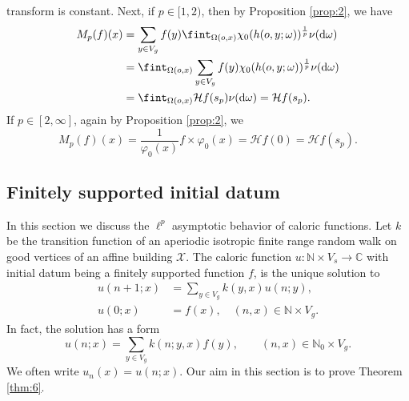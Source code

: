 \documentclass[11pt]{amsart}
\newcommand{\CC}{\mathbb{C}}
\newcommand{\NN}{\mathbb{N}}
\newcommand{\calH}{\mathcal{H}}
\newcommand{\scrX}{\mathscr{X}}
\newcommand{\vphi}{\varphi}
\theoremstyle{plain}
\newcounter{thm}
\theoremstyle{definition}
\numberwithin{equation}{section}
\begin{document}
transform is constant. Next, if $p \in [1, 2)$, then by Proposition \ref{prop:2}, we have
\begin{align*}
	M_p(f)(x) 
	&= \sum_{y \in V_g} f(y) \fint_{\Omega(o, x)} \chi_0(h(o, y; \omega))^{\frac1p} \nu({\rm d} \omega) \\
	&= \fint_{\Omega(o, x)} \sum_{y \in V_g} f(y) \chi_0(h(o, y; \omega))^{\frac1p} \nu({\rm d} \omega) \\
	&= \fint_{\Omega(o, x)} \calH f(s_p) \nu({\rm d} \omega) = \calH f(s_p).
\end{align*}
If $p \in [2, \infty]$, again by Proposition \ref{prop:2}, we
\[
	M_p(f)(x) 
	= \frac{1}{\vphi_0(x)} f \times \vphi_0(x)
	= \calH f(0) = \calH f(s_p).
\]

\subsection{Finitely supported initial datum}
In this section we discuss the $\ell^p$ asymptotic behavior of caloric functions. Let $k$ be the transition function of 
an aperiodic isotropic finite range random walk on good vertices of an affine building $\scrX$. The caloric function 
$u: \NN \times V_s \rightarrow \CC$ with initial datum being a finitely supported function $f$, is the unique solution to
\begin{equation}
	\label{eq:71}
	\begin{aligned}
		u(n+1; x) &= \sum_{y \in V_g} k(y, x) u(n; y), \\
		u(0; x) &= f(x), \quad (n, x) \in \NN \times V_g.
	\end{aligned}
\end{equation}
In fact, the solution has a form
\[
	u(n; x) = \sum_{y \in V_g} k(n; y, x)f(y), \qquad (n, x) \in \NN_0 \times V_g.
\]
We often write $u_n(x) = u(n; x)$. Our aim in this section is to prove Theorem \ref{thm:6}. 
\end{document}
